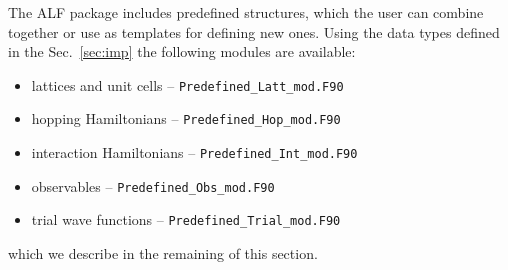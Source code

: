 

\label{Predefined_chap}
The ALF package includes predefined structures, which the user can combine together or use as templates for defining new ones. Using the data types defined in the Sec.~\ref{sec:imp} the following modules are available:
\begin{itemize}
	\item lattices and unit cells -- \texttt{Predefined\_Latt\_mod.F90}
	\item hopping Hamiltonians -- \texttt{Predefined\_Hop\_mod.F90 }
	\item interaction Hamiltonians -- \texttt{Predefined\_Int\_mod.F90}
	\item observables -- \texttt{Predefined\_Obs\_mod.F90 }
	\item trial wave functions -- \texttt{Predefined\_Trial\_mod.F90 }
\end{itemize}
which we describe in the remaining of this section.














